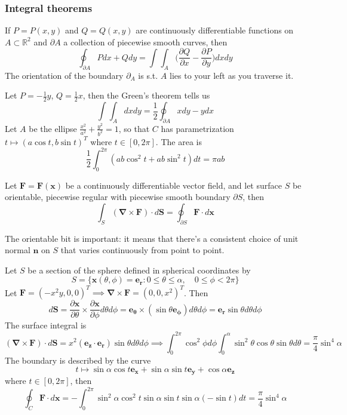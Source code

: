 \documentclass[a4paper]{article}
\begin{document}
\subsubsection*{Integral theorems}
\begin{thm}
If $P=P(x,y)$ and $Q=Q(x,y)$ are continuously differentiable functions on $A\subset\mathbb{R}^2$ and $\partial A$ a collection of piecewise smooth curves, then
\begin{equation}
    \oint_{\partial A}Pdx+Qdy=\int\int_A\bigg(\frac{\partial Q}{\partial x}-\frac{\partial P}{\partial y}\bigg)dxdy\tag{1.22}
\end{equation}
The orientation of the boundary $\partial_A$ is s.t. $A$ lies to your left as you traverse it.
\end{thm}
\begin{eg}
Let $P=-\frac{1}{2}y$, $Q=\frac{1}{2}x$, then the Green's theorem tells us
$$\int\int_Adxdy=\frac{1}{2}\oint_{\partial A}xdy-ydx$$
Let $A$ be the ellipse $\frac{x^2}{a^2}+\frac{y^2}{b^2}=1$, so that $C$ has parametrization $t\mapsto(a\cos t,b\sin t)^T$ where $t\in[0,2\pi]$. The area is
$$\frac{1}{2}\int_0^{2\pi}(ab\cos^2t+ab\sin^2t)dt=\pi ab$$
\end{eg}
\begin{thm}
Let $\mathbf{F}=\mathbf{F}(\mathbf{x})$ be a continuously differentiable vector field, and let surface $S$ be orientable, piecewise regular with piecewise smooth boundary $\partial S$, then
\begin{equation}
    \int_S(\boldsymbol{\nabla}\times\mathbf{F})\cdot d\mathbf{S}=\oint_{\partial S}\mathbf{F}\cdot d\mathbf{x}\tag{1.23}
\end{equation}
\end{thm}
The orientable bit is important: it means that there’s a consistent choice of unit normal $\mathbf{n}$ on $S$ that varies continuously from point to point.
\begin{eg}
Let $S$ be a section of the sphere defined in spherical coordinates by
$$S=\{\mathbf{x}(\theta,\phi)=\mathbf{e_r}:0\leq\theta\leq\alpha,\quad 0\leq\phi<2\pi\}$$
Let $\mathbf{F}=(-x^2y,0,0)^T\implies\boldsymbol{\nabla}\times\mathbf{F}=(0,0,x^2)^T$. Then
$$d\mathbf{S}=\frac{\partial\mathbf{x}}{\partial\theta}\times\frac{\partial\mathbf{x}}{\partial\phi}d\theta d\phi=\boldsymbol{e_\theta}\times(\sin\theta\boldsymbol{e_\phi})d\theta d\phi=\mathbf{e_r}\sin\theta d\theta d\phi$$
The surface integral is
$$(\boldsymbol{\nabla}\times\mathbf{F})\cdot d\mathbf{S}=x^2(\mathbf{e_z}\cdot\mathbf{e_r})\sin\theta d\theta d\phi\implies\int_0^{2\pi}\cos^2\phi d\phi\int_0^\alpha\sin^2\theta\cos\theta\sin\theta d\theta=\frac{\pi}{4}\sin^4\alpha$$
The boundary is described by the curve
$$t\mapsto \sin\alpha\cos t\mathbf{e_x}+\sin\alpha\sin t\mathbf{e_y}+\cos\alpha\mathbf{e_z}$$
where $t\in[0,2\pi]$, then
$$\oint_C\mathbf{F}\cdot d\mathbf{x}=-\int_0^{2\pi}\sin^2\alpha\cos^2t\sin\alpha\sin t\sin\alpha(-\sin t)dt=\frac{\pi}{4}\sin^4\alpha$$
\end{eg}
\end{document}
